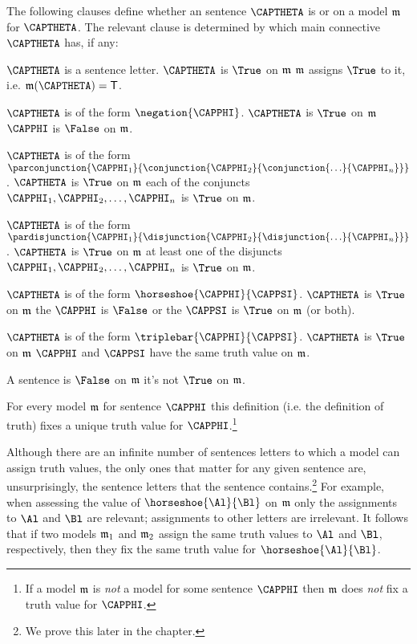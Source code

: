 \begin{majorILnc}{} The following clauses define whether an \GSL{} sentence $\CAPTHETA$ is \nidf{$\True$} or \nidf{$\False$} on a model $\mathfrak{m}$ for $\CAPTHETA$. The relevant clause is determined by which main connective $\CAPTHETA$ has, if any:
\begin{cenumerate}
\item $\CAPTHETA$ is a sentence letter. $\CAPTHETA$ is $\True$ on $\mathfrak{m}$ \Iff $\mathfrak{m}$ assigns $\True$ to it, i.e. $\IntA(\CAPTHETA)=\TrueB$.
\item $\CAPTHETA$ is of the form $\negation{\CAPPHI}$. $\CAPTHETA$ is $\True$ on $\mathfrak{m}$ \Iff $\CAPPHI$ is $\False$ on $\mathfrak{m}$.
\item\label{GSL true conjunction} $\CAPTHETA$ is of the form $\parconjunction{\CAPPHI_1}{\conjunction{\CAPPHI_2}{\conjunction{\ldots}{\CAPPHI_{\integer{n}}}}}$.   $\CAPTHETA$ is $\True$ on $\mathfrak{m}$ \Iff each of the conjuncts $\CAPPHI_1, \CAPPHI_2, \ldots, \CAPPHI_n$ is $\True$ on $\mathfrak{m}$.
\item $\CAPTHETA$ is of the form $\pardisjunction{\CAPPHI_1}{\disjunction{\CAPPHI_2}{\disjunction{\ldots}{\CAPPHI_{\integer{n}}}}}$. $\CAPTHETA$ is $\True$ on $\mathfrak{m}$ \Iff at least one of the disjuncts $\CAPPHI_1, \CAPPHI_2, \ldots, \CAPPHI_n$ is $\True$ on $\mathfrak{m}$.
\item\label{GSL true horseshoe} $\CAPTHETA$ is of the form $\horseshoe{\CAPPHI}{\CAPPSI}$. $\CAPTHETA$ is $\True$ on $\mathfrak{m}$ \Iff the  $\CAPPHI$ is $\False$ or the  $\CAPPSI$ is $\True$ on $\mathfrak{m}$ (or both).
\item $\CAPTHETA$ is of the form $\triplebar{\CAPPHI}{\CAPPSI}$. $\CAPTHETA$ is $\True$ on $\mathfrak{m}$ \Iff $\CAPPHI$ and $\CAPPSI$ have the same truth value on $\mathfrak{m}$.
\item A sentence is $\False$ on $\mathfrak{m}$ \Iff it's not $\True$ on $\mathfrak{m}$.
\end{cenumerate}
\end{majorILnc}

For every model $\mathfrak{m}$ for sentence $\CAPPHI$ this definition (i.e. the definition of truth) fixes a unique truth value for $\CAPPHI$.\footnote{If a model $\mathfrak{m}$ is \emph{not} a model for some \GSL{} sentence $\CAPPHI$ then $\mathfrak{m}$ does \emph{not} fix a truth value for $\CAPPHI$.}

Although there are an infinite number of \GSL{} sentences letters to which a model can assign truth values, the only ones that matter for any given sentence are, unsurprisingly, the sentence letters that the sentence contains.\footnote{
	We prove this later in the chapter.
}
For example, when assessing the value of $\horseshoe{\Al}{\Bl}$ on $\mathfrak{m}$ only the assignments to $\Al$ and $\Bl$ are relevant; assignments to other letters are irrelevant. It follows that if two models $\mathfrak{m}_1$ and $\mathfrak{m}_2$ assign the same truth values to $\Al$ and $\Bl$, respectively, then they fix the same truth value for $\horseshoe{\Al}{\Bl}$. 

